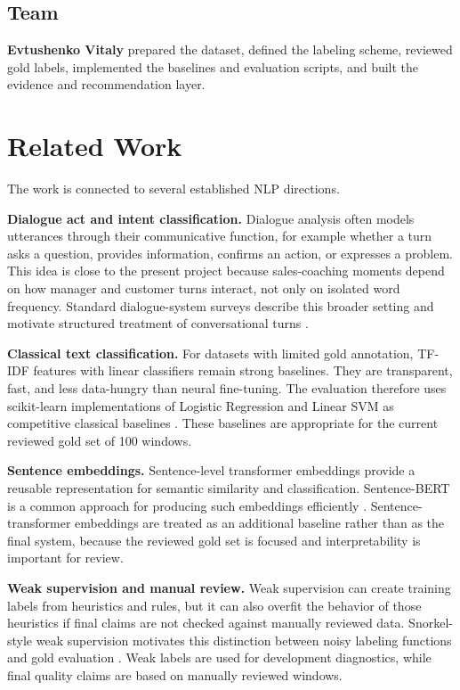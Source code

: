 \documentclass{article}
\begin{document}
\subsection{Team}
\textbf{Evtushenko Vitaly} prepared the dataset, defined the labeling scheme, reviewed gold labels, implemented the baselines and evaluation scripts, and built the evidence and recommendation layer.

\section{Related Work}
\label{sec:related}
The work is connected to several established NLP directions.

\textbf{Dialogue act and intent classification.} Dialogue analysis often models utterances through their communicative function, for example whether a turn asks a question, provides information, confirms an action, or expresses a problem. This idea is close to the present project because sales-coaching moments depend on how manager and customer turns interact, not only on isolated word frequency. Standard dialogue-system surveys describe this broader setting and motivate structured treatment of conversational turns \cite{jurafskyMartin2024}.

\textbf{Classical text classification.} For datasets with limited gold annotation, TF-IDF features with linear classifiers remain strong baselines. They are transparent, fast, and less data-hungry than neural fine-tuning. The evaluation therefore uses scikit-learn implementations of Logistic Regression and Linear SVM as competitive classical baselines \cite{pedregosa2011scikit}. These baselines are appropriate for the current reviewed gold set of 100 windows.

\textbf{Sentence embeddings.} Sentence-level transformer embeddings provide a reusable representation for semantic similarity and classification. Sentence-BERT is a common approach for producing such embeddings efficiently \cite{reimers2019sentencebert}. Sentence-transformer embeddings are treated as an additional baseline rather than as the final system, because the reviewed gold set is focused and interpretability is important for review.

\textbf{Weak supervision and manual review.} Weak supervision can create training labels from heuristics and rules, but it can also overfit the behavior of those heuristics if final claims are not checked against manually reviewed data. Snorkel-style weak supervision motivates this distinction between noisy labeling functions and gold evaluation \cite{ratner2017snorkel}. Weak labels are used for development diagnostics, while final quality claims are based on manually reviewed windows.
\end{document}
